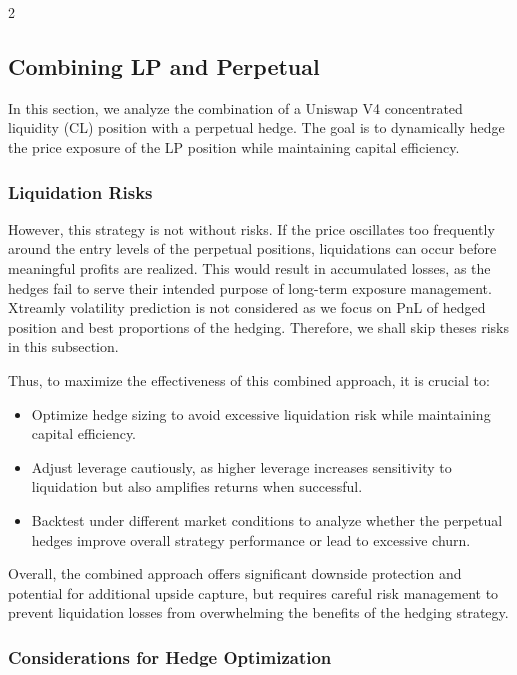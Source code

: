 \documentclass[12pt]{article}
\begin{document}
\begin{multicols}{2}
\medskip

\subsection{Combining LP and Perpetual}
\label{sec:fiveway}

In this section, we analyze the combination of a Uniswap V4 concentrated liquidity (CL) position with a perpetual hedge. The goal is to dynamically hedge the price exposure of the LP position while maintaining capital efficiency.  

\subsubsection{Liquidation Risks}

However, this strategy is not without risks. If the price oscillates too frequently around the entry levels of the perpetual positions, liquidations can occur before meaningful profits are realized. This would result in accumulated losses, as the hedges fail to serve their intended purpose of long-term exposure management. Xtreamly volatility prediction is not considered as we focus on PnL of hedged position and best proportions of the hedging. Therefore, we shall skip theses risks in this subsection.

\medskip

Thus, to maximize the effectiveness of this combined approach, it is crucial to:
\begin{itemize}
    \item Optimize hedge sizing to avoid excessive liquidation risk while maintaining capital efficiency.
    \item Adjust leverage cautiously, as higher leverage increases sensitivity to liquidation but also amplifies returns when successful.
    \item Backtest under different market conditions to analyze whether the perpetual hedges improve overall strategy performance or lead to excessive churn.
\end{itemize}

Overall, the combined approach offers significant downside protection and potential for additional upside capture, but requires careful risk management to prevent liquidation losses from overwhelming the benefits of the hedging strategy.

\subsubsection{Considerations for Hedge Optimization}


\end{multicols}
\end{document}
